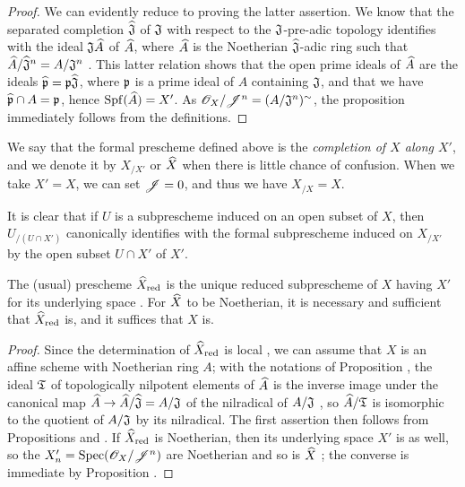 \begin{proof}
\label{proof-1.10.8.5}
We can evidently reduce to proving the latter assertion.
We know  that the separated completion $\widehat{\mathfrak{J}}$ of $\mathfrak{J}$ with respect to the $\mathfrak{J}$-pre-adic topology identifies with the ideal $\mathfrak{J}\widehat{A}$ of $\widehat{A}$, where $\widehat{A}$ is the Noetherian $\widehat{\mathfrak{J}}$-adic ring such that $\widehat{A}/\widehat{\mathfrak{J}}^n=A/\mathfrak{J}^n$ .
This latter relation shows that the open prime ideals of $\widehat{A}$ are the ideals $\widehat{\mathfrak{p}}=\mathfrak{p}\widehat{\mathfrak{J}}$, where $\mathfrak{p}$ is a prime ideal of $A$ containing $\mathfrak{J}$, and that we have $\widehat{\mathfrak{p}}\cap A=\mathfrak{p}$, hence ${\mathop{\mathrm{Spf}}\nolimits}(\widehat{A})=X'$.
As $\mathscr{O}_X/\mathscr{J}^n=(A/\mathfrak{J}^n)^\sim$, the proposition immediately follows from the definitions.
\end{proof}

We say that the formal prescheme defined above is the \emph{completion of $X$ along $X'$}, and we denote it by $X_{/X'}$ or $\widehat{X}$ when there is little chance of confusion.
When we take $X'=X$, we can set $\mathscr{J}=0$, and thus we have $X_{/X}=X$.

It is clear that if $U$ is a subprescheme induced on an open subset of $X$, then $U_{/(U\cap X')}$ canonically identifies with the formal subprescheme induced on $X_{/X'}$ by the open subset $U\cap X'$ of $X'$.

\begin{cor}[10.8.6]
\label{1.10.8.6}
The (usual) prescheme $\widehat{X}_\mathrm{red}$ is the unique reduced subprescheme of $X$ having $X'$ for its underlying space .
For $\widehat{X}$ to be Noetherian, it is necessary and sufficient that $\widehat{X}_\mathrm{red}$ is, and it suffices that $X$ is.
\end{cor}

\begin{proof}
\label{proof-1.10.8.6}
Since the determination of $\widehat{X}_\mathrm{red}$ is local , we can assume that $X$ is an affine scheme with Noetherian ring $A$; with the notations of Proposition , the ideal $\mathfrak{T}$ of topologically nilpotent elements of $\widehat{A}$ is the inverse image under the canonical map $\wh{A}\to\wh{A}/\wh{\fk{J}}=A/\fk{J}$ of the nilradical of $A/\mathfrak{J}$ , so $\widehat{A}/\mathfrak{T}$ is isomorphic to the quotient of $A/\mathfrak{J}$ by its nilradical.
The first assertion then follows from Propositions  and .
If $\widehat{X}_\mathrm{red}$ is Noetherian, then its underlying space $X'$ is as well, so the $X_n'={\mathop{\mathrm{Spec}}\nolimits}(\mathscr{O}_X/\mathscr{J}^n)$ are Noetherian  and so is $\widehat{X}$ ; the converse is immediate by Proposition .
\end{proof}

